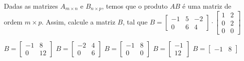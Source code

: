 Dadas as matrizes $A_{m\times n}$ e $B_{n\times p}$, temos que o produto $AB$ é uma matriz de ordem $m\times p$. Assim, calcule a matriz $B$, tal que $B = \left[ \begin{array}{ccc}
-1 & 5 & -2 \\
0 & 6 & 4
\end{array} \right] \cdot \left[ \begin{array}{cc}
1 & 2 \\
0 & 2 \\
0 & 0
\end{array} \right]$

$B=\left[ \begin{array}{cc} -1 & 8 \\ 0 & 12 \end{array} \right]$
$B=\left[ \begin{array}{cc} -2 & 4 \\ 0 & 6 \end{array} \right]$
$B=\left[ \begin{array}{cc} -1 & 8 \\ 0 & 0 \end{array} \right]$
$B=\left[ \begin{array}{c} -1 \\ 12 \end{array} \right]$
$B=\left[ \begin{array}{cc} -1 & 8 \end{array} \right]$



